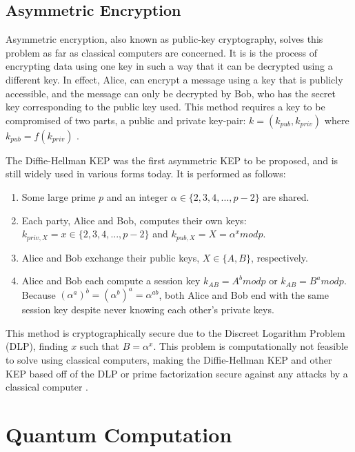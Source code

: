 \subsection{Asymmetric Encryption}
Asymmetric encryption, also known as public-key cryptography, solves this problem as far as classical computers are concerned.
It is is the process of encrypting data using one key in such a way that it can be decrypted using a different key.
In effect, Alice, can encrypt a message using a key that is publicly accessible, and the message can only be decrypted by Bob, who has the secret key corresponding to the public key used.
This method requires a key to be compromised of two parts, a public and private key-pair: $k = (k_{pub}, k_{priv})$ where $k_{pub} = f(k_{priv})$ \cite{cryptography}.


The Diffie-Hellman KEP was the first asymmetric KEP to be proposed, and is still widely used in various forms today. 
It is performed as follows:

\begin{enumerate}
\item Some large prime $p$ and an integer $\alpha \in \{2,3,4,...,p-2\}$ are shared.
\item Each party, Alice and Bob, computes their own keys: $k_{priv,X} = x \in \{2,3,4,...,p-2\}$ and $k_{pub, X} = X =  \alpha^x mod p$.
\item Alice and Bob exchange their public keys, $X \in \{A, B\}$, respectively. 
\item Alice and Bob each compute a session key $k_{AB} = A^b mod p$ or $k_{AB} = B^a mod p$. Because $(\alpha^a)^b = (\alpha^b)^a = \alpha^{ab}$, both Alice and Bob end with the same session key despite never knowing each other's private keys. 
\end{enumerate}

This method is cryptographically secure due to the Discreet Logarithm Problem (DLP), finding $x$ such that $B = \alpha^x$. 
This problem is computationally not feasible to solve using classical computers, making the Diffie-Hellman KEP and other KEP based off of the DLP or prime factorization secure against any attacks by a classical computer \cite{qc:agi}.

\section{Quantum Computation}

